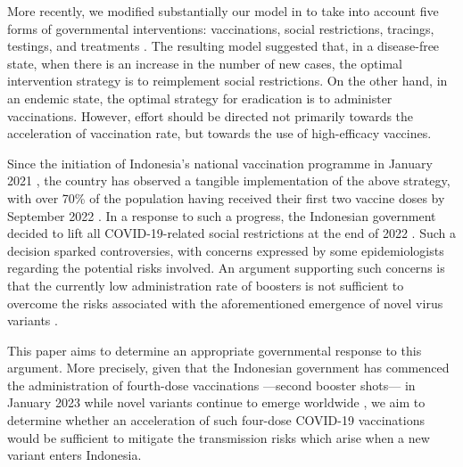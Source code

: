 \documentclass[11pt,reqno]{amsart}
\begin{document}
More recently, we modified substantially our model in \cite{YongOwenHoseana} to take into account five forms of governmental interventions: vaccinations, social restrictions, tracings, testings, and treatments \cite{YongHoseanaOwen2}. The resulting model suggested that, in a disease-free state, when there is an increase in the number of new cases, the optimal intervention strategy is to reimplement social restrictions. On the other hand, in an endemic state, the optimal strategy for eradication is to administer vaccinations. However, effort should be directed not primarily towards the acceleration of vaccination rate, but towards the use of high-efficacy vaccines.

Since the initiation of Indonesia's national vaccination programme in January 2021 \cite{Triwadani}, the country has observed a tangible implementation of the above strategy, with over 70\% of the population having received their first two vaccine doses by September 2022 \cite{FirdausFardahHaryati}. In a response to such a progress, the Indonesian government decided to lift all COVID-19-related social restrictions at the end of 2022 \cite{Hidayat}. Such a decision sparked controversies, with concerns expressed by some epidemiologists regarding the potential risks involved. An argument supporting such concerns is that the currently low administration rate of boosters is not sufficient to overcome the risks associated with the aforementioned emergence of novel virus variants \cite{Mufarida,UlyaMovanita}.

This paper aims to determine an appropriate governmental response to this argument. More precisely, given that the Indonesian government has commenced the administration of fourth-dose vaccinations ---second booster shots--- in January 2023 \cite{MuthiarinyArkyasa} while novel variants continue to emerge worldwide \cite{Swaroop,Singh}, we aim to determine whether an acceleration of such four-dose COVID-19 vaccinations would be sufficient to mitigate the transmission risks which arise when a new variant enters Indonesia.
\end{document}
